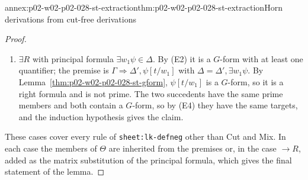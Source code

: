 \begin{annexitem}{annex:p02-w02-p02-028-st-extraction}{thm:p02-w02-p02-028-st-extraction}{Horn derivations from cut-free derivations}
\begin{proof}
\begin{enumerate}
        If \(\beta_1\) is a target of \(\Delta_1\), it is a target of
        \(\Delta\) by (E4) and is derivable in \(\mathsf H\) by (E1).
        Otherwise \(\beta_1=\theta P^j_l\), which is derivable in \(\mathsf H\)
        by (E1); let \(\delta_0\) be such a derivation.  Since \(\beta_2\) is a
        target of \(\Delta\) by (E4), it suffices to derive it in
        \(\mathsf H\).  Every axiom and rule of
        \(\mathsf H(\Theta_2;\theta R_l,\Gamma_2)\) belongs to \(\mathsf H\)
        except possibly the one contributed by \(\theta R_l\): the axiom
        \(\theta C^j\) if \(l=r(j)\), the rule
        \(\theta P^j_{l+1}\cdots\theta P^j_{r(j)}/\theta C^j\) if \(l<r(j)\).
        The tail \(\theta(P^j_l\to R_l)\in\Gamma\) contributes to \(\mathsf H\)
        the rule \(\theta P^j_l\cdots\theta P^j_{r(j)}/\theta C^j\).  Let
        \(\delta\) derive \(\beta_2\) in
        \(\mathsf H(\Theta_2;\theta R_l,\Gamma_2)\).  In the sequence
        \(\delta_0\) followed by \(\delta\), every line of \(\delta_0\) is
        justified in \(\mathsf H\); every line of \(\delta\) justified by an
        axiom or rule of \(\mathsf H\) keeps its justification; and a line
        \(\theta C^j\) justified by the contribution of \(\theta R_l\) is the
        conclusion of the rule
        \(\theta P^j_l\cdots\theta P^j_{r(j)}/\theta C^j\) of \(\mathsf H\),
        whose premise \(\theta P^j_l\) occurs in \(\delta_0\) and whose
        remaining premises occur earlier in \(\delta\).  So \(\beta_2\) is
        derivable in \(\mathsf H\).
  \item \emph{\(\exists R\)} with principal formula
        \(\exists w_1\psi\in\Delta\).  By (E2) it is a \(G\)-form with at
        least one quantifier; the premise is
        \(\Gamma\Rightarrow\Delta',\psi[t/w_1]\) with
        \(\Delta=\Delta',\exists w_1\psi\).  By
        Lemma~\ref{thm:p02-w02-p02-028-st-gform}, \(\psi[t/w_1]\) is a
        \(G\)-form, so it is a right formula and is not prime.  The two
        succedents have the same prime members and both contain a \(G\)-form,
        so by (E4) they have the same targets, and the induction hypothesis
        gives the claim.
\end{enumerate}
These cases cover every rule of \texttt{sheet:lk-defneg} other than Cut and
Mix.  In each case the members of \(\Theta\) are inherited from the premises
or, in the case \(\to R\), added as the matrix substitution of the principal
formula, which gives the final statement of the lemma.
\end{proof}
\end{annexitem}

